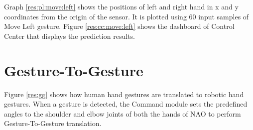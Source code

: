 

Graph \ref{res:pl:move:left} shows the positions of left and right hand in x and y coordinates from the origin of the sensor. It is plotted using 60 input samples of Move Left gesture. Figure \ref{res:cc:move:left} shows the dashboard of Control Center that displays the prediction results. 

\clearpage

\section{Gesture-To-Gesture}
Figure \ref{res:gg} shows how human hand gestures are translated to robotic hand gestures. When a gesture is detected, the Command module sets the predefined angles to the shoulder and elbow joints of both the hands of NAO to perform Gesture-To-Gesture translation. 



